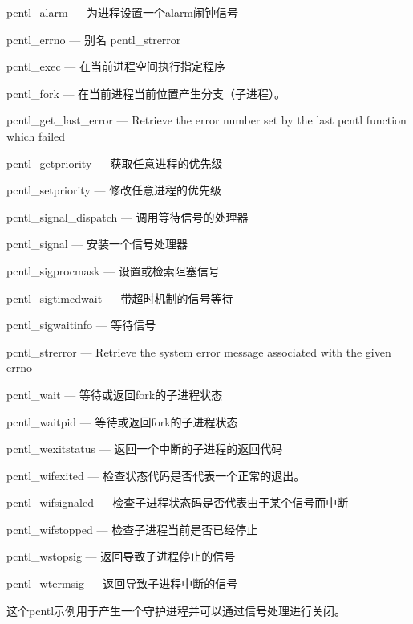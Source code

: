 \begin{compactitem}
\item pcntl\_alarm — 为进程设置一个alarm闹钟信号
\item pcntl\_errno — 别名 pcntl\_strerror
\item pcntl\_exec — 在当前进程空间执行指定程序
\item pcntl\_fork — 在当前进程当前位置产生分支（子进程）。
\item pcntl\_get\_last\_error — Retrieve the error number set by the last pcntl function which failed
\item pcntl\_getpriority — 获取任意进程的优先级
\item pcntl\_setpriority — 修改任意进程的优先级
\item pcntl\_signal\_dispatch — 调用等待信号的处理器
\item pcntl\_signal — 安装一个信号处理器
\item pcntl\_sigprocmask — 设置或检索阻塞信号
\item pcntl\_sigtimedwait — 带超时机制的信号等待
\item pcntl\_sigwaitinfo — 等待信号
\item pcntl\_strerror — Retrieve the system error message associated with the given errno
\item pcntl\_wait — 等待或返回fork的子进程状态
\item pcntl\_waitpid — 等待或返回fork的子进程状态
\item pcntl\_wexitstatus — 返回一个中断的子进程的返回代码
\item pcntl\_wifexited — 检查状态代码是否代表一个正常的退出。
\item pcntl\_wifsignaled — 检查子进程状态码是否代表由于某个信号而中断
\item pcntl\_wifstopped — 检查子进程当前是否已经停止
\item pcntl\_wstopsig — 返回导致子进程停止的信号
\item pcntl\_wtermsig — 返回导致子进程中断的信号
\end{compactitem}


这个pcntl示例用于产生一个守护进程并可以通过信号处理进行关闭。


